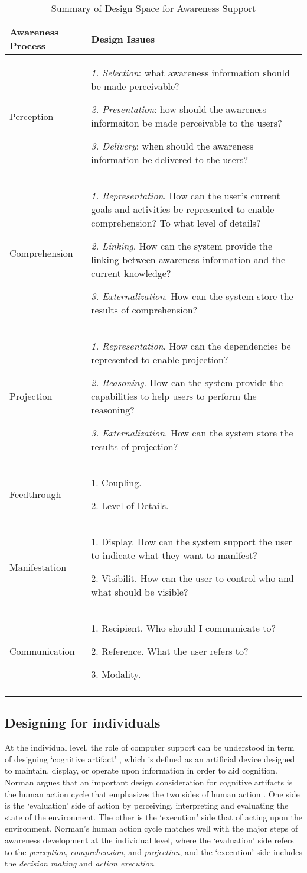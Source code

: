 {\footnotesize
	\begin{longtable}{>{\raggedright}m{1.2in}>{\raggedright}p{4in}}
\toprule 
Awareness Process & Design Issues\tabularnewline
\midrule 
Perception & \emph{1. Selection}: what awareness information should be made perceivable?

\emph{2. Presentation}: how should the awareness informaiton be made
perceivable to the users?

\emph{3. Delivery}: when should the awareness information be delivered
to the users?\tabularnewline
\midrule 
Comprehension & \emph{1. Representation}. How can the user's current goals and activities
be represented to enable comprehension? To what level of details?

\emph{2. Linking}. How can the system provide the linking between
awareness information and the current knowledge?

\emph{3. Externalization}. How can the system store the results of
comprehension? \tabularnewline
\midrule 
Projection & \emph{1. Representation}. How can the dependencies be represented
to enable projection? 

\emph{2. Reasoning}. How can the system provide the capabilities to
help users to perform the reasoning?

\emph{3. Externalization}. How can the system store the results of
projection? \tabularnewline
\midrule 
Feedthrough & 1. Coupling.

2. Level of Details.\tabularnewline
\midrule 
Manifestation & 1. Display. How can the system support the user to indicate what they
want to manifest?

2. Visibilit. How can the user to control who and what should be visible?\tabularnewline
\midrule 
Communication & 1. Recipient. Who should I communicate to?

2. Reference. What the user refers to?

3. Modality. \tabularnewline
\bottomrule
\caption{Summary of Design Space for Awareness Support}
\label{tab:design_space}
\end{longtable}}


\subsection{Designing for individuals} %
\label{sub:designing_for_individuals}
At the individual level, the role of computer support can be understood in term of designing `cognitive artifact' \cite{Norman1992}, which is defined as an artificial device designed to maintain, display, or operate upon information in order to aid cognition. Norman argues that an important design consideration for cognitive artifacts is the human action cycle that emphasizes the two sides of human action \cite{Norman1992}. One side is the `evaluation' side of action by perceiving, interpreting and evaluating the state of the environment. The other is the `execution' side that of acting upon the environment. Norman's human action cycle matches well with the major steps of awareness development at the individual level, where the `evaluation' side refers to the \emph{perception}, \emph{comprehension}, and \emph{projection}, and the `execution' side includes the \emph{decision making} and \emph{action execution}.

